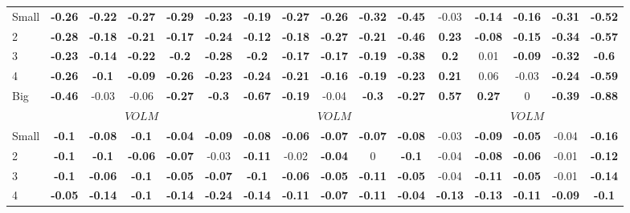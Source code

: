 \begin{table}[H]
\begin{tabular}{lccccc|ccccc|ccccc}
Small & \textbf{-0.26} & \textbf{-0.22} & \textbf{-0.27} & \textbf{-0.29} & \textbf{-0.23} & \textbf{-0.19} & \textbf{-0.27} & \textbf{-0.26} & \textbf{-0.32} & \textbf{-0.45} & -0.03 & \textbf{-0.14} & \textbf{-0.16} & \textbf{-0.31} & \textbf{-0.52} \\
2 & \textbf{-0.28} & \textbf{-0.18} & \textbf{-0.21} & \textbf{-0.17} & \textbf{-0.24} & \textbf{-0.12} & \textbf{-0.18} & \textbf{-0.27} & \textbf{-0.21} & \textbf{-0.46} & \textbf{0.23} & \textbf{-0.08} & \textbf{-0.15} & \textbf{-0.34} & \textbf{-0.57} \\
3 & \textbf{-0.23} & \textbf{-0.14} & \textbf{-0.22} & \textbf{-0.2} & \textbf{-0.28} & \textbf{-0.2} & \textbf{-0.17} & \textbf{-0.17} & \textbf{-0.19} & \textbf{-0.38} & \textbf{0.2} & 0.01 & \textbf{-0.09} & \textbf{-0.32} & \textbf{-0.6} \\
4 & \textbf{-0.26} & \textbf{-0.1} & \textbf{-0.09} & \textbf{-0.26} & \textbf{-0.23} & \textbf{-0.24} & \textbf{-0.21} & \textbf{-0.16} & \textbf{-0.19} & \textbf{-0.23} & \textbf{0.21} & 0.06 & -0.03 & \textbf{-0.24} & \textbf{-0.59} \\
Big & \textbf{-0.46} & -0.03 & -0.06 & \textbf{-0.27} & \textbf{-0.3} & \textbf{-0.67} & \textbf{-0.19} & -0.04 & \textbf{-0.3} & \textbf{-0.27} & \textbf{0.57} & \textbf{0.27} & 0 & \textbf{-0.39} & \textbf{-0.88} \\
 & \multicolumn{5}{c|}{$VOLM$} & \multicolumn{5}{c|}{$VOLM$} & \multicolumn{5}{c}{$VOLM$} \\
Small & \textbf{-0.1} & \textbf{-0.08} & \textbf{-0.1} & \textbf{-0.04} & \textbf{-0.09} & \textbf{-0.08} & \textbf{-0.06} & \textbf{-0.07} & \textbf{-0.07} & \textbf{-0.08} & -0.03 & \textbf{-0.09} & \textbf{-0.05} & -0.04 & \textbf{-0.16} \\
2 & \textbf{-0.1} & \textbf{-0.1} & \textbf{-0.06} & \textbf{-0.07} & -0.03 & \textbf{-0.11} & -0.02 & \textbf{-0.04} & 0 & \textbf{-0.1} & -0.04 & \textbf{-0.08} & \textbf{-0.06} & -0.01 & \textbf{-0.12} \\
3 & \textbf{-0.1} & \textbf{-0.06} & \textbf{-0.1} & \textbf{-0.05} & \textbf{-0.07} & \textbf{-0.1} & \textbf{-0.06} & \textbf{-0.05} & \textbf{-0.11} & \textbf{-0.05} & -0.04 & \textbf{-0.11} & \textbf{-0.05} & -0.01 & \textbf{-0.14} \\
4 & \textbf{-0.05} & \textbf{-0.14} & \textbf{-0.1} & \textbf{-0.14} & \textbf{-0.24} & \textbf{-0.14} & \textbf{-0.11} & \textbf{-0.07} & \textbf{-0.11} & \textbf{-0.04} & \textbf{-0.13} & \textbf{-0.13} & \textbf{-0.11} & \textbf{-0.09} & \textbf{-0.1} \\

\end{tabular}
\end{table}
